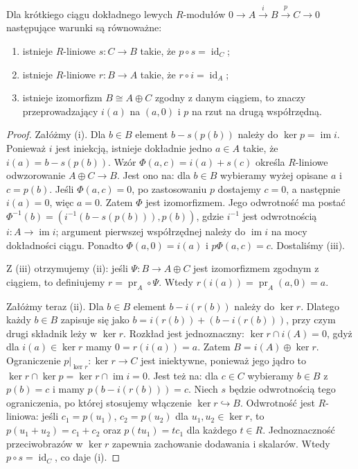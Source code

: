 \begin{twierdzenie}
\label{aa:tw:modules-splitting}
Dla krótkiego ciągu dokładnego lewych $R$-modułów
$0\to A\xrightarrow{i}B\xrightarrow{p}C\to0$
następujące warunki są równoważne:
\begin{enumerate}[label=\textup{(\roman*)}]
\item istnieje $R$-liniowe $s:C\to B$ takie, że
$p\circ s=\operatorname{id}_C$;
\item istnieje $R$-liniowe $r:B\to A$ takie, że
$r\circ i=\operatorname{id}_A$;
\item istnieje izomorfizm $B\cong A\oplus C$
zgodny z danym ciągiem, to znaczy przeprowadzający
$i(a)$ na $(a,0)$ i $p$ na rzut na drugą współrzędną.
\end{enumerate}
\end{twierdzenie}
\begin{proof}
Załóżmy (i). Dla $b\in B$ element
$b-s(p(b))$ należy do $\ker p=\operatorname{im}i$.
Ponieważ $i$ jest iniekcją, istnieje dokładnie
jedno $a\in A$ takie, że
$i(a)=b-s(p(b))$. Wzór
$\Phi(a,c)=i(a)+s(c)$ określa $R$-liniowe
odwzorowanie $A\oplus C\to B$. Jest ono na:
dla $b\in B$ wybieramy wyżej opisane $a$ i
$c=p(b)$. Jeśli $\Phi(a,c)=0$, po zastosowaniu
$p$ dostajemy $c=0$, a następnie $i(a)=0$,
więc $a=0$. Zatem $\Phi$ jest izomorfizmem.
Jego odwrotność ma postać
$\Phi^{-1}(b)=(i^{-1}(b-s(p(b))),p(b))$,
gdzie $i^{-1}$ jest odwrotnością $i:A\to\operatorname{im}i$;
argument pierwszej współrzędnej należy do
$\operatorname{im}i$ na mocy dokładności ciągu.
Ponadto $\Phi(a,0)=i(a)$ i $p\Phi(a,c)=c$.
Dostaliśmy (iii).

Z (iii) otrzymujemy (ii): jeśli
$\Psi:B\to A\oplus C$ jest izomorfizmem zgodnym
z ciągiem, to definiujemy $r=\operatorname{pr}_A\circ\Psi$.
Wtedy $r(i(a))=\operatorname{pr}_A(a,0)=a$.

Załóżmy teraz (ii). Dla $b\in B$ element
$b-i(r(b))$ należy do $\ker r$. Dlatego
każdy $b\in B$ zapisuje się jako
$b=i(r(b))+(b-i(r(b)))$, przy czym drugi składnik
leży w $\ker r$. Rozkład jest jednoznaczny:
$\ker r\cap i(A)=0$, gdyż dla $i(a)\in\ker r$
mamy $0=r(i(a))=a$. Zatem
$B=i(A)\oplus\ker r$. Ograniczenie
$p|_{\ker r}:\ker r\to C$ jest iniektywne,
ponieważ jego jądro to
$\ker r\cap\ker p=\ker r\cap\operatorname{im}i=0$.
Jest też na: dla $c\in C$ wybieramy $b\in B$
z $p(b)=c$ i mamy
$p(b-i(r(b)))=c$. Niech
$s$ będzie odwrotnością tego ograniczenia,
po której stosujemy włączenie $\ker r\hookrightarrow B$.
Odwrotność jest $R$-liniowa: jeśli $c_1=p(u_1)$,
$c_2=p(u_2)$ dla $u_1,u_2\in\ker r$, to
$p(u_1+u_2)=c_1+c_2$ oraz $p(tu_1)=tc_1$
dla każdego $t\in R$. Jednoznaczność przeciwobrazów
w $\ker r$ zapewnia zachowanie dodawania i skalarów.
Wtedy $p\circ s=\operatorname{id}_C$, co daje (i).
\end{proof}

